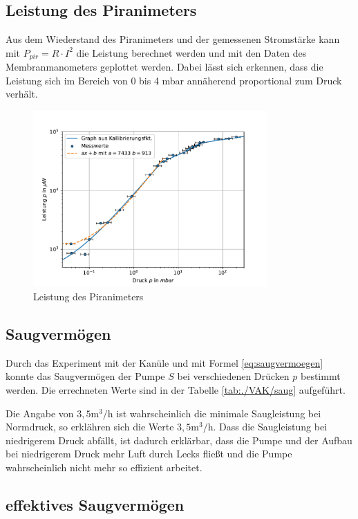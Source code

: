 \documentclass[11pt, a4paper]{article}
\begin{document}
    \subsection{Leistung des Piranimeters}
    Aus dem Wiederstand des Piranimeters und der gemessenen Stromstärke kann mit $P_{pir} = R \cdot I^2$ die Leistung berechnet werden und mit den Daten des Membranmanometers geplottet werden. Dabei lässt sich erkennen, dass die Leistung sich im Bereich von 0 bis 4 \si{\milli\bar} annäherend proportional zum Druck verhält. 
    \begin{figure}[h]
        \centering
        \includegraphics[width=0.8\textwidth]{Pp_Graph.pdf}
        \caption{Leistung des Piranimeters}
        \label{fig:Pzup}
    \end{figure}



    \subsection{Saugvermögen}
    Durch das Experiment mit der Kanüle und mit Formel \ref{eq:saugvermoegen} konnte das Saugvermögen der Pumpe $S$ bei verschiedenen Drücken $p$ bestimmt werden. Die errechneten Werte sind in der Tabelle \ref{tab:./VAK/saug} aufgeführt.
    
    Die Angabe von $3,5 \si{\meter\cubed\per\hour}$ ist wahrscheinlich die minimale Saugleistung bei Normdruck, so erklähren sich die Werte \> $3,5 \si{\meter\cubed\per\hour}$. Dass die Saugleistung bei niedrigerem Druck abfällt, ist dadurch erklärbar, dass die Pumpe und der Aufbau bei niedrigerem Druck mehr Luft durch Lecks fließt und die Pumpe wahrscheinlich nicht mehr so effizient arbeitet.

    \subsection{effektives Saugvermögen}
\end{document}
